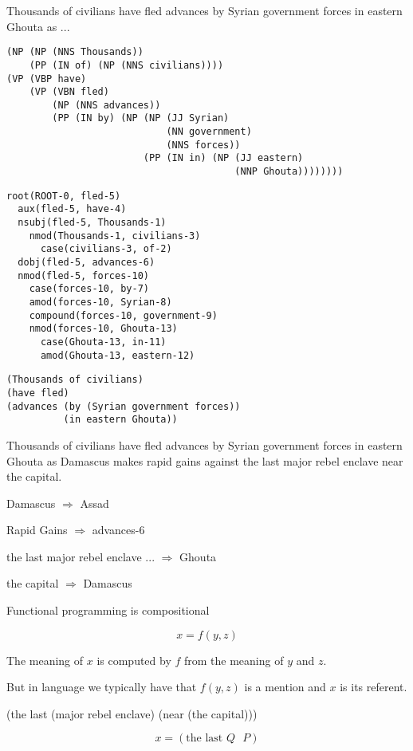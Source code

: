 {Thousands of civilians have fled advances by Syrian government forces in eastern Ghouta as ...

\begin{verbatim}
(NP (NP (NNS Thousands))
    (PP (IN of) (NP (NNS civilians))))
(VP (VBP have)
    (VP (VBN fled)
        (NP (NNS advances))
        (PP (IN by) (NP (NP (JJ Syrian)
                            (NN government)
                            (NNS forces))
                        (PP (IN in) (NP (JJ eastern)
                                        (NNP Ghouta))))))))
\end{verbatim}


\begin{verbatim}
root(ROOT-0, fled-5)
  aux(fled-5, have-4)
  nsubj(fled-5, Thousands-1)
    nmod(Thousands-1, civilians-3)
      case(civilians-3, of-2)
  dobj(fled-5, advances-6)
  nmod(fled-5, forces-10)
    case(forces-10, by-7)
    amod(forces-10, Syrian-8)
    compound(forces-10, government-9)
    nmod(forces-10, Ghouta-13)
      case(Ghouta-13, in-11)
      amod(Ghouta-13, eastern-12)
\end{verbatim}


\begin{verbatim}
(Thousands of civilians)
(have fled)
(advances (by (Syrian government forces))
          (in eastern Ghouta))
\end{verbatim}


{\color{blue} Thousands of civilians have fled advances by Syrian government forces in eastern Ghouta as}
Damascus makes rapid gains against the last major rebel enclave near the capital.

\vfill
Damascus $\Rightarrow$ Assad

\vfill
Rapid Gains $\Rightarrow$ advances-6

\vfill
the last major rebel enclave ... $\Rightarrow$ Ghouta

\vfill
the capital $\Rightarrow$ Damascus


Functional programming is compositional

\vfill
$$x = f(y,z)$$

\vfill
The meaning of $x$ is computed by $f$ from the meaning of $y$ and $z$.

\vfill
But in language we typically have that $f(y,z)$ is a mention and $x$ is its referent.

\vfill
(the last (major rebel enclave) (near (the capital)))

\vfill
$$x = (\mbox{the last $Q$ $P$})$$


}

